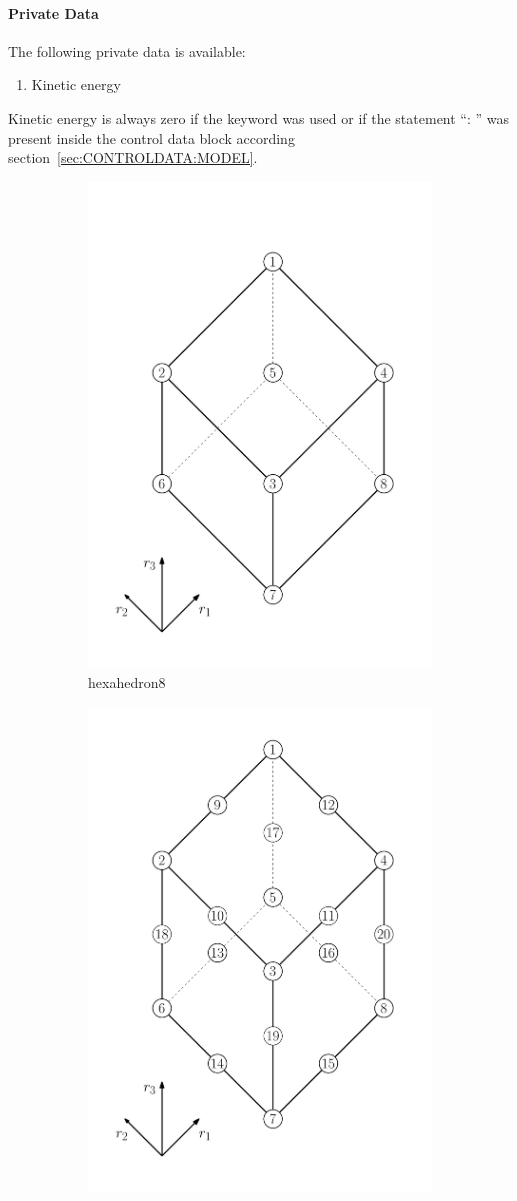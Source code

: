 \paragraph{Private Data}
\label{sec:EL:SOLID:PRIVATE}
The following private data is available:
\begin{enumerate}
\item {} Kinetic energy
\end{enumerate}
Kinetic energy is always zero if the keyword  was used or if the statement
``: '' was present inside the control data block according
section~\ref{sec:CONTROLDATA:MODEL}.

\begin{figure}[htb]
  \begin{subfigure}{0.5\textwidth}
    \centering
    \includegraphics[width=.5\textwidth]{hexahedron8}
    \caption{hexahedron8}
    \label{fig:EL:SOLID:HEXAHEDRON8}
  \end{subfigure}
  \begin{subfigure}{0.5\textwidth}
    \centering
    \includegraphics[width=.5\textwidth]{hexahedron20}

\end{subfigure}
\end{figure}
